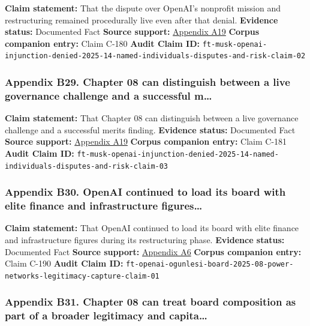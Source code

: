 \documentclass[
  american,
  11pt,
  letterpaper,
]{article}
\begin{document}
\textbf{Claim statement:} That the dispute over OpenAI's nonprofit
mission and restructuring remained procedurally live even after that
denial. \textbf{Evidence status:} Documented Fact \textbf{Source
support:}
\hyperref[appendix-a19-judge-denies-elon-musks-attempt-to-immediately-block-openais-conversion-to-for-profit-entity]{Appendix
A19} \textbf{Corpus companion entry:} Claim C-180 \textbf{Audit Claim
ID:}
\texttt{ft-musk-openai-injunction-denied-2025-14-named-individuals-disputes-and-risk-claim-02}

\subsubsection{Appendix B29. Chapter 08 can distinguish between a live
governance challenge and a successful
m\ldots{}}\label{appendix-b29-chapter-08-can-distinguish-between-a-live-governance-challenge-and-a-successful-m}

\textbf{Claim statement:} That Chapter 08 can distinguish between a live
governance challenge and a successful merits finding. \textbf{Evidence
status:} Documented Fact \textbf{Source support:}
\hyperref[appendix-a19-judge-denies-elon-musks-attempt-to-immediately-block-openais-conversion-to-for-profit-entity]{Appendix
A19} \textbf{Corpus companion entry:} Claim C-181 \textbf{Audit Claim
ID:}
\texttt{ft-musk-openai-injunction-denied-2025-14-named-individuals-disputes-and-risk-claim-03}

\subsubsection{Appendix B30. OpenAI continued to load its board with
elite finance and infrastructure
figures\ldots{}}\label{appendix-b30-openai-continued-to-load-its-board-with-elite-finance-and-infrastructure-figures}

\textbf{Claim statement:} That OpenAI continued to load its board with
elite finance and infrastructure figures during its restructuring phase.
\textbf{Evidence status:} Documented Fact \textbf{Source support:}
\hyperref[appendix-a6-openai-appoints-one-of-wall-street-s-most-powerful-dealmakers-to-its-board]{Appendix
A6} \textbf{Corpus companion entry:} Claim C-190 \textbf{Audit Claim
ID:}
\texttt{ft-openai-ogunlesi-board-2025-08-power-networks-legitimacy-capture-claim-01}

\subsubsection{Appendix B31. Chapter 08 can treat board composition as
part of a broader legitimacy and
capita\ldots{}}\label{appendix-b31-chapter-08-can-treat-board-composition-as-part-of-a-broader-legitimacy-and-capita}
\end{document}
